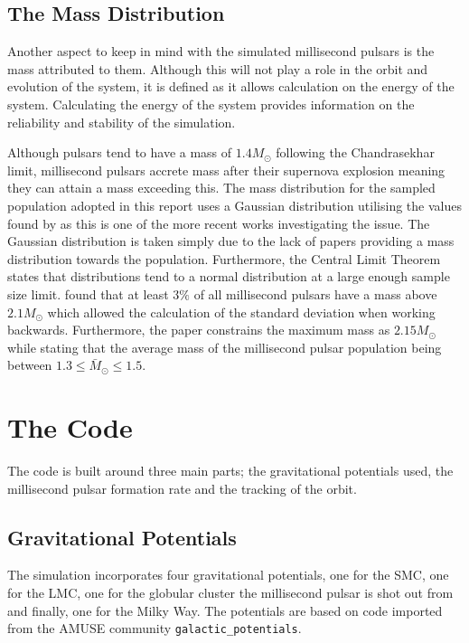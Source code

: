 \subsection{The Mass Distribution}

Another aspect to keep in mind with the simulated millisecond pulsars is the mass attributed to them. Although this will not play a role in the orbit and evolution of the system, it is defined as it allows calculation on the energy of the system. Calculating the energy of the system provides information on the reliability and stability of the simulation.

Although pulsars tend to have a mass of $1.4M_\odot$ following the Chandrasekhar limit, millisecond pulsars accrete mass after their supernova explosion meaning they can attain a mass exceeding this. The mass distribution for the sampled population adopted in this report uses a Gaussian distribution utilising the values found by \cite{Antoniadis2016} as this is one of the more recent works investigating the issue. The Gaussian distribution is taken simply due to the lack of papers providing a mass distribution towards the population. Furthermore, the Central Limit Theorem states that distributions tend to a normal distribution at a large enough sample size limit. \cite{Antoniadis2016} found that at least $3\%$ of all millisecond pulsars have a mass above $2.1 M_\odot$ which allowed the calculation of the standard deviation when working backwards. Furthermore, the paper constrains the maximum mass as $2.15 M_\odot$ while stating that the average mass of the millisecond pulsar population being between $1.3 \leq \bar{M}_\odot \leq 1.5$.



\section{The Code}\label{TheoryBehindtheCode}
\setcounter{figure}{0} 

The code is built around three main parts; the gravitational potentials used, the millisecond pulsar formation rate and the tracking of the orbit.

\subsection{Gravitational Potentials}

The simulation incorporates four gravitational potentials, one for the SMC, one for the LMC, one for the globular cluster the millisecond pulsar is shot out from and finally, one for the Milky Way. The potentials are based on code imported from the AMUSE community \texttt{galactic\_potentials}.

